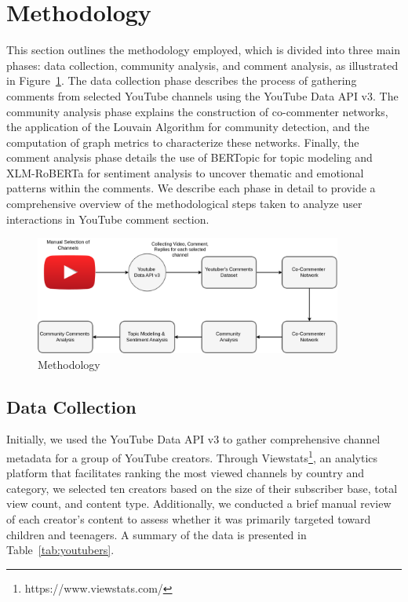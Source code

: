 \documentclass[12pt]{article}
\begin{document}
\section{Methodology}

This section outlines the methodology employed, which is divided into three main phases: 
data collection, community analysis, and comment analysis, as illustrated in Figure~\ref{fig:methodology}. 
The data collection phase describes the process of gathering comments from selected YouTube channels 
using the YouTube Data API v3. The community analysis phase explains the construction of co-commenter 
networks, the application of the Louvain Algorithm for community detection, and the computation of 
graph metrics to characterize these networks. Finally, the comment analysis phase details the use of 
BERTopic for topic modeling and XLM-RoBERTa for sentiment analysis to uncover thematic and emotional 
patterns within the comments. We describe each phase in detail to provide a comprehensive overview 
of the methodological steps taken to analyze user interactions in YouTube comment section.

\begin{figure}[t!]
    \centering
    \includegraphics[keepaspectratio,width=0.9\textwidth]{./imgs/tcc_methodology.png}
    \caption{Methodology}
    \label{fig:methodology}
\end{figure}

\subsection{Data Collection}

Initially, we used the YouTube Data API v3 to gather comprehensive channel metadata for a group of 
YouTube creators. Through Viewstats\footnote{https://www.viewstats.com/}, an analytics platform 
that facilitates ranking the most viewed channels by country and category, we selected ten creators 
based on the size of their subscriber base, total view count, and content type. Additionally, we 
conducted a brief manual review of each creator's content to assess whether it was 
primarily targeted toward children and teenagers.
A summary of the data is presented in Table~\ref{tab:youtubers}.
\end{document}
